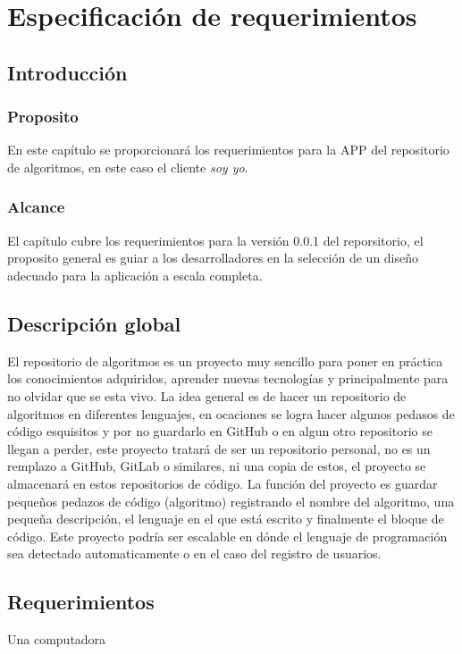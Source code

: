 

\chapter{Especificación de requerimientos}
\section{Introducción}
\subsection{Proposito}
En este capítulo se proporcionará los requerimientos para la APP del repositorio de algoritmos, en este caso el cliente \textit{soy yo}.

\subsection{Alcance}
El capítulo cubre los requerimientos para la versión 0.0.1 del reporsitorio, el proposito general es guiar a los desarrolladores en la selección de un diseño adecuado para la aplicación a escala completa.

\section{Descripción global}
El repositorio de algoritmos es un proyecto muy sencillo para poner en práctica los conocimientos adquiridos, aprender nuevas tecnologías y principalmente para no olvidar que se esta vivo. La idea general es de hacer un repositorio de algoritmos en diferentes lenguajes, en ocaciones se logra hacer algunos pedasos de código esquisitos y por no guardarlo en GitHub o en algun otro repositorio se llegan a perder, este proyecto tratará de ser un repositorio personal, no es un remplazo a GitHub, GitLab o similares, ni una copia de estos, el proyecto se almacenará en estos repositorios de código. 
La función del proyecto es guardar pequeños pedazos de código (algoritmo) registrando el nombre del algoritmo, una pequeña descripción, el lenguaje en el que está escrito y finalmente el bloque de código. Este proyecto podría ser escalable en dónde el lenguaje de programación sea detectado automaticamente o en el caso del registro de usuarios.

\section{Requerimientos}
Una computadora
